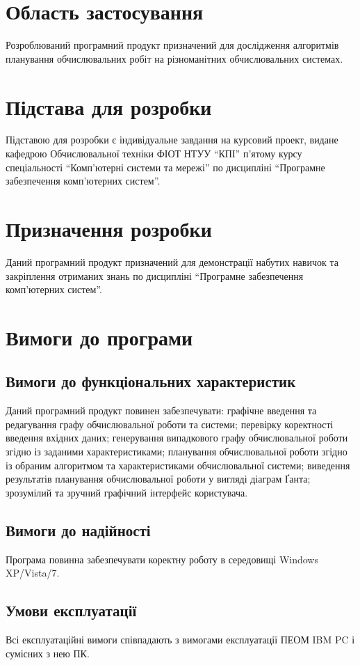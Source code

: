 \documentclass[ukrainian,utf8,nostitching,14pt]{eskdtext}
\begin{document}
\lstset{
basicstyle=\footnotesize,
numberstyle=\tiny,
tabsize=4,
breaklines=true,
title=\lstname
}

\section{Область застосування}
Розроблюваний програмний продукт призначений для дослідження алгоритмів планування обчислювальних робіт на різноманітних обчислювальних системах.

\section{Підстава для розробки}
Підставою для розробки є індивідуальне завдання на курсовий проект, видане кафедрою Обчислювальної техніки ФІОТ НТУУ “КПІ” п’ятому курсу спеціальності “Комп’ютерні системи та мережі” по дисципліні “Програмне забезпечення комп’ютерних систем”.

\section{Призначення розробки}
Даний програмний продукт призначений для демонстрації набутих навичок та закріплення отриманих знань по дисципліні “Програмне забезпечення комп’ютерних систем”.

\section{Вимоги до програми}
\subsection{Вимоги до функціональних характеристик}
Даний програмний продукт повинен забезпечувати:
графічне введення та редагування графу обчислювальної роботи та системи;
перевірку коректності введення вхідних даних;
генерування випадкового графу обчислювальної роботи згідно із заданими характеристиками;
планування обчислювальної роботи згідно із обраним алгоритмом та характеристиками обчислювальної системи;
виведення результатів планування обчислювальної роботи у вигляді діаграм Ґанта;
зрозумілий та зручний графічний інтерфейс користувача.
\subsection{Вимоги до надійності}
Програма повинна забезпечувати коректну роботу в середовищі Windows XP/Vista/7.
\subsection{Умови експлуатації}
        Всі експлуатаційні вимоги співпадають з вимогами експлуатації ПЕОМ IBM PC і сумісних з нею ПК.
\end{document}

